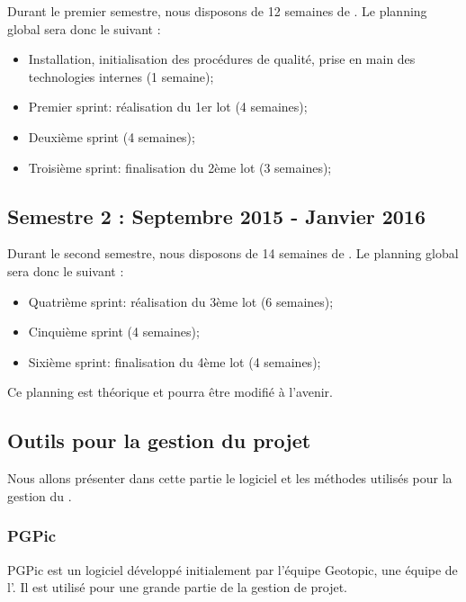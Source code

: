 Durant le premier semestre, nous disposons de 12 semaines de \PICCourt. Le planning global sera donc le suivant : 
\begin{itemize}
\item Installation, initialisation des procédures de qualité, prise en main des technologies internes (1 semaine);
\item Premier sprint: réalisation du 1er lot (4 semaines);
\item Deuxième sprint (4 semaines);
\item Troisième sprint: finalisation du 2ème lot (3 semaines);
\end{itemize}

\subsection*{Semestre 2 : Septembre 2015 - Janvier 2016}

Durant le second semestre, nous disposons de 14 semaines de \PICCourt. Le planning global sera donc le suivant : 
\begin{itemize}
\item Quatrième sprint: réalisation du 3ème lot (6 semaines);
\item Cinquième sprint (4 semaines);
\item Sixième sprint: finalisation du 4ème lot (4 semaines);\\
\end{itemize}

Ce planning est théorique et pourra être modifié à l'avenir. 

\subsection{Outils pour la gestion du projet}
\label{outils_gestion}

Nous allons présenter dans cette partie le logiciel et les méthodes utilisés pour la gestion du \PICCourt. \\

\subsubsection*{PGPic}

PGPic est un logiciel développé initialement par l'équipe Geotopic, une équipe \PICCourt de l'\INSACourt. Il est utilisé pour une grande partie de la gestion de projet. \\

